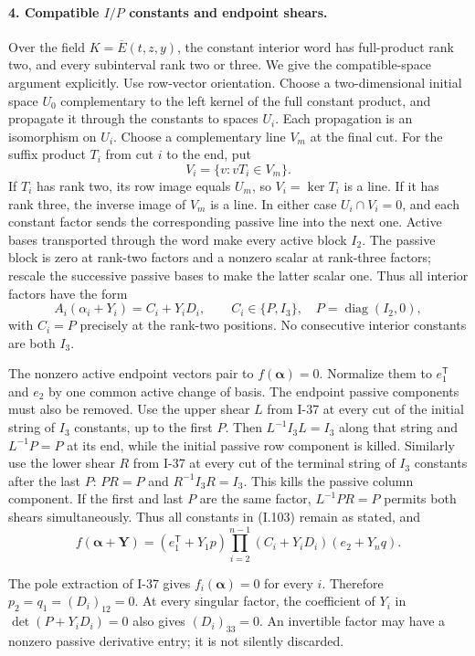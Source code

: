 \paragraph{4. Compatible $I/P$ constants and endpoint shears.}
Over the field $K=\overline E(t,z,y)$, the constant interior word
has full-product rank two, and every subinterval rank two or
three. We give the compatible-space argument explicitly.
Use row-vector orientation. Choose a two-dimensional initial
space $U_0$ complementary to the left kernel of the full
constant product, and propagate it through the constants to
spaces $U_i$. Each propagation is an isomorphism on $U_i$.
Choose a complementary line $V_m$ at the final cut. For the
suffix product $T_i$ from cut $i$ to the end, put
\[
 V_i=\{v:vT_i\in V_m\}.
\]
If $T_i$ has rank two, its row image equals $U_m$, so
$V_i=\ker T_i$ is a line. If it has rank three, the inverse
image of $V_m$ is a line. In either case $U_i\cap V_i=0$,
and each constant factor sends the corresponding passive line
into the next one. Active bases transported through the word
make every active block $I_2$. The passive block is zero at
rank-two factors and a nonzero scalar at rank-three factors;
rescale the successive passive bases to make the latter scalar
one. Thus all interior factors have the form
\[
 A_i(\alpha_i+Y_i)=C_i+Y_iD_i,
 \qquad C_i\in\{P,I_3\},\quad P=\operatorname{diag}(I_2,0),
 \tag{I.103}
\]
with $C_i=P$ precisely at the rank-two positions. No consecutive
interior constants are both $I_3$.

The nonzero active endpoint vectors pair to
$f(\boldsymbol\alpha)=0$. Normalize them to $e_1^{\mathsf T}$
and $e_2$ by one common active change of basis. The endpoint
passive components must also be removed. Use the upper shear
$L$ from I-37 at every cut of the initial string of $I_3$
constants, up to the first $P$. Then
$L^{-1}I_3L=I_3$ along that string and $L^{-1}P=P$ at its end,
while the initial passive row component is killed. Similarly
use the lower shear $R$ from I-37 at every cut of the terminal
string of $I_3$ constants after the last $P$:
$PR=P$ and $R^{-1}I_3R=I_3$. This kills the passive column
component. If the first and last $P$ are the same factor,
$L^{-1}PR=P$ permits both shears simultaneously. Thus all
constants in (I.103) remain as stated, and
\[
 f(\boldsymbol\alpha+\mathbf Y)
 =(e_1^{\mathsf T}+Y_1p)
   \prod_{i=2}^{n-1}(C_i+Y_iD_i)
   (e_2+Y_nq).
 \tag{I.104}
\]

The pole extraction of I-37 gives $f_i(\boldsymbol\alpha)=0$
for every $i$. Therefore $p_2=q_1=(D_i)_{12}=0$. At every
singular factor, the coefficient of $Y_i$ in
$\det(P+Y_iD_i)=0$ also gives $(D_i)_{33}=0$. An invertible
factor may have a nonzero passive derivative entry; it is not
silently discarded.

